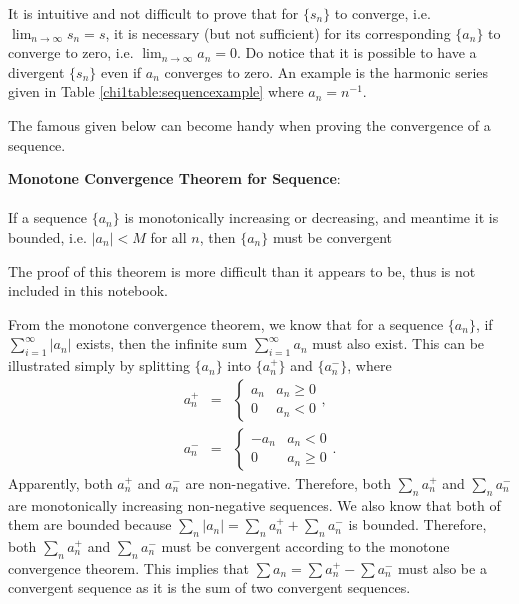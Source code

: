 It is intuitive and not difficult to prove that for $\{s_n\}$ to converge, i.e. $\lim_{n\rightarrow\infty}s_n = s$, it is necessary (but not sufficient) for its corresponding $\{a_n\}$ to converge to zero, i.e. $\lim_{n\rightarrow\infty}a_n = 0$. Do notice that it is possible to have a divergent $\{s_n\}$ even if $a_n$ converges to zero. An example is the harmonic series given in Table \ref{chi1table:sequencexample} where $a_n = n^{-1}$. 

The famous  given below can become handy when proving the convergence of a sequence.
\begin{VF}
\textbf{Monotone Convergence Theorem for Sequence}:
\\
\\
\noindent If a sequence $\{a_n\}$ is monotonically increasing or decreasing, and meantime it is bounded, i.e. $|a_n| < M$ for all $n$, then $\{a_n\}$ must be convergent
\end{VF}
The proof of this theorem is more difficult than it appears to be, thus is not included in this notebook.

From the monotone convergence theorem, we know that for a sequence $\{a_n\}$, if $\sum_{i=1}^{\infty}|a_n|$ exists, then the infinite sum $\sum_{i=1}^{\infty}a_n$ must also exist. This can be illustrated simply by splitting $\{a_n\}$ into $\{a_n^+\}$ and $\{a_n^-\}$, where
\begin{eqnarray}
  a_n^+ &=& \left\{\begin{array}{cc}
                     a_n & a_n \geq 0 \\
                     0 & a_n < 0
                   \end{array}\right.,  \nonumber \\
  a_n^- &=& \left\{\begin{array}{cc}
                     -a_n & a_n < 0 \\
                     0 & a_n \geq 0
                   \end{array}\right.. \nonumber
\end{eqnarray}
Apparently, both $a_n^+$ and $a_n^-$ are non-negative. Therefore, both $\sum_na_n^+$ and $\sum_na_n^-$ are monotonically increasing non-negative sequences. We also know that both of them are bounded because $\sum_{n}|a_n| = \sum_{n}a_n^+ + \sum_{n}a_n^-$ is bounded. Therefore, both $\sum_na_n^+$ and $\sum_na_n^-$ must be convergent according to the monotone convergence theorem. This implies that $\sum a_n = \sum a_n^+ - \sum a_n^-$ must also be a convergent sequence as it is the sum of two convergent sequences.

